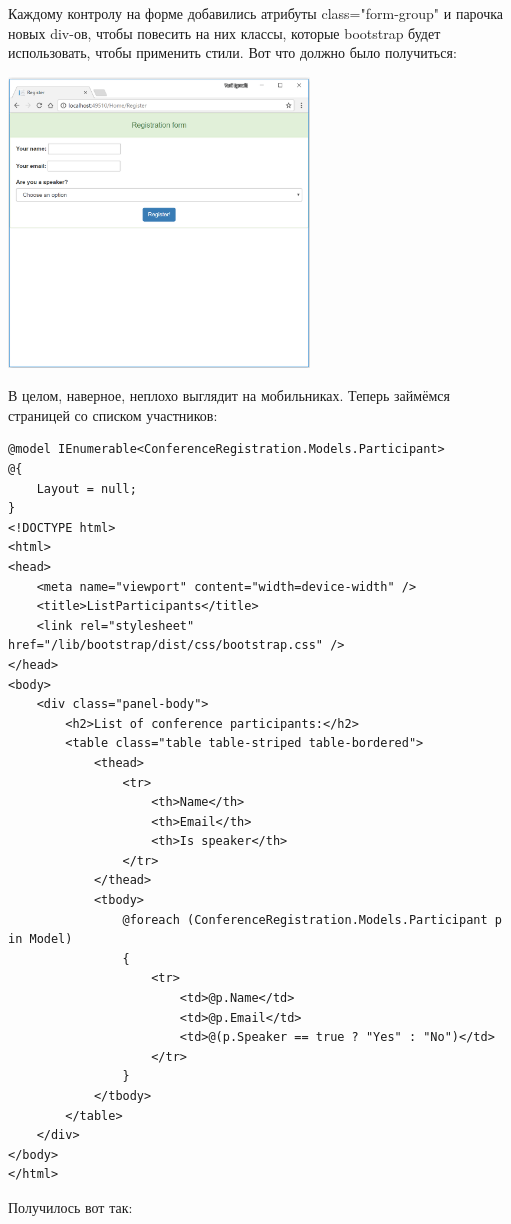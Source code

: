 \documentclass[a5paper]{article}
\begin{document}
Каждому контролу на форме добавились атрибуты class="form-group" и парочка новых div-ов, чтобы повесить на них классы, которые bootstrap будет использовать, чтобы применить стили. Вот что должно было получиться:

\begin{center}
	\includegraphics[width=0.6\textwidth]{styledRegisterForm.png}
\end{center}

В целом, наверное, неплохо выглядит на мобильниках. Теперь займёмся страницей со списком участников:

\begin{verbatim}
@model IEnumerable<ConferenceRegistration.Models.Participant>
@{
    Layout = null;
}
<!DOCTYPE html>
<html>
<head>
    <meta name="viewport" content="width=device-width" />
    <title>ListParticipants</title>
    <link rel="stylesheet" href="/lib/bootstrap/dist/css/bootstrap.css" />
</head>
<body>
    <div class="panel-body">
        <h2>List of conference participants:</h2>
        <table class="table table-striped table-bordered">
            <thead>
                <tr>
                    <th>Name</th>
                    <th>Email</th>
                    <th>Is speaker</th>
                </tr>
            </thead>
            <tbody>
                @foreach (ConferenceRegistration.Models.Participant p in Model)
                {
                    <tr>
                        <td>@p.Name</td>
                        <td>@p.Email</td>
                        <td>@(p.Speaker == true ? "Yes" : "No")</td>
                    </tr>
                }
            </tbody>
        </table>
    </div>
</body>
</html>
\end{verbatim}

Получилось вот так:
\end{document}

